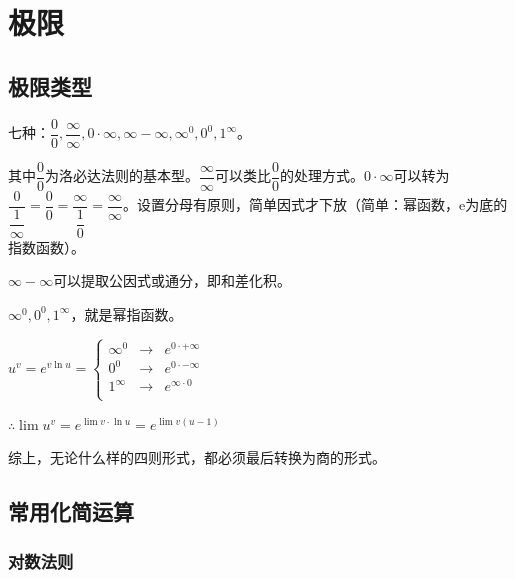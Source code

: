 \chapter{极限}\label{chap:极限}
%


\section{极限类型}

七种：$\dfrac{0}{0},\dfrac{\infty}{\infty},0\cdot\infty,\infty-\infty,\infty^0,0^0,1^\infty$。

\medskip

其中$\dfrac{0}{0}$为洛必达法则的基本型。$\dfrac{\infty}{\infty}$可以类比$\dfrac{0}{0}$的处理方式。$0\cdot\infty$可以转为$\dfrac{0}{\dfrac{1}{\infty}}=\dfrac{0}{0}=\dfrac{\infty}{\dfrac{1}{0}}=\dfrac{\infty}{\infty}$。设置分母有原则，简单因式才下放（简单：幂函数，e为底的指数函数）。

\medskip

$\infty-\infty$可以提取公因式或通分，即和差化积。

\medskip

$\infty^0,0^0,1^\infty$，就是幂指函数。

\medskip

$
u^v=e^{v\ln u}=\left\{
\begin{array}{lcl}
    \infty^0 & \rightarrow & e^{0\cdot+\infty} \\
    0^0      & \rightarrow & e^{0\cdot-\infty} \\
    1^\infty & \rightarrow & e^{\infty\cdot 0} \\
\end{array} \right.
$

\medskip

$\therefore \lim u^v=e^{\lim v\cdot\ln u}=e^{\lim v(u-1)}$

综上，无论什么样的四则形式，都必须最后转换为商的形式。


\section{常用化简运算}

\subsection{对数法则}

